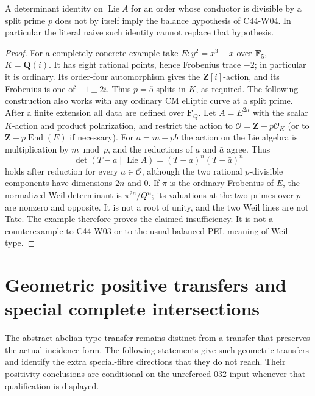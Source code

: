\begin{proposition}
A determinant identity on $\operatorname{Lie}A$ for an order whose
conductor is divisible by a split prime $p$ does not by itself
imply the balance hypothesis of C44-W04.  In particular the
literal naive such identity cannot replace that hypothesis.
\end{proposition}

\begin{proof}
For a completely concrete example take
$E:y^2=x^3-x$ over $\mathbf F_5$, $K=\mathbf Q(i)$.
It has eight rational points, hence Frobenius trace $-2$;
in particular it is ordinary.  Its order-four automorphism
gives the $\mathbf Z[i]$-action, and its Frobenius is one
of $-1\pm2i$.  Thus $p=5$ splits in $K$, as required.
The following construction also works with any ordinary
CM elliptic curve at a split prime.  After a finite
extension all data are defined over $\mathbf F_Q$.
Let $A=E^{2n}$ with the scalar $K$-action and product polarization,
and restrict the action to $\mathcal O=\mathbf Z+p\mathcal O_K$
(or to $\mathbf Z+p\operatorname{End}(E)$ if necessary).
For $a=m+pb$ the action on the Lie algebra is multiplication by
$m\bmod p$, and the reductions of $a$ and $\bar a$ agree.
Thus
\[
 \det(T-a\mid\operatorname{Lie}A)
 =(T-a)^n(T-\bar a)^n
\]
holds after reduction for every $a\in\mathcal O$, although the
two rational $p$-divisible components have dimensions $2n$ and
$0$.  If $\pi$ is the ordinary Frobenius of $E$, the normalized
Weil determinant is $\pi^{2n}/Q^n$; its valuations at the two
primes over $p$ are nonzero and opposite.  It is not a root of
unity, and the two Weil lines are not Tate.  The example
therefore proves the claimed insufficiency.  It is not a
counterexample to C44-W03 or to the usual balanced PEL meaning
of Weil type.
\end{proof}

\section{Geometric positive transfers and special complete intersections}

The abstract abelian-type transfer remains distinct from a transfer that
preserves the actual incidence form. The following statements give
such geometric transfers and identify the extra special-fibre directions
that they do not reach. Their positivity conclusions are conditional
on the unrefereed 032 input whenever that qualification is displayed.

